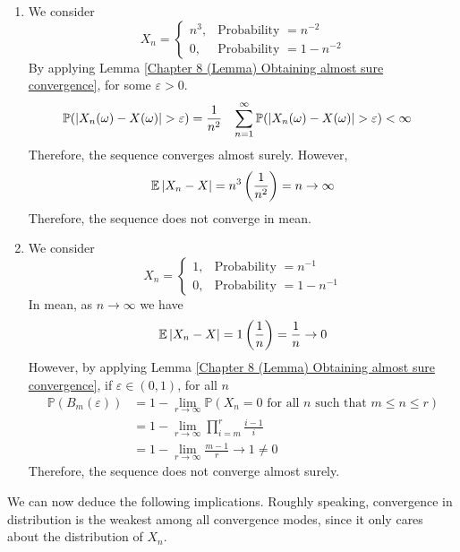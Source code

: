 \documentclass{huhtakm-template-book}
\newcommand{\prob}{\mathbb{P}}
\newcommand{\expect}{\mathbb{E}}
\begin{document}
\begin{proofing}
	\begin{enumerate}
		\item We consider
		\begin{equation*}
			X_{n}=\begin{cases}
				n^{3}, &\text{Probability }=n^{-2}\\
				0, &\text{Probability }=1-n^{-2}
			\end{cases}
		\end{equation*}
		By applying Lemma \ref{Chapter 8 (Lemma) Obtaining almost sure convergence}, for some $\varepsilon>0$.
		\begin{align*}
			\prob(\abs{X_{n}(\omega)-X(\omega)}>\varepsilon)&=\frac{1}{n^{2}} & \sum_{n=1}^{\infty}\prob(\abs{X_{n}(\omega)-X(\omega)}>\varepsilon)&<\infty
		\end{align*}
		Therefore, the sequence converges almost surely. However,
		\begin{equation*}
			\expect\abs{X_{n}-X}=n^{3}\left(\frac{1}{n^{2}}\right)=n\to\infty
		\end{equation*}
		Therefore, the sequence does not converge in mean.
		\item We consider
		\begin{equation*}
			X_{n}=\begin{cases}
				1, &\text{Probability }=n^{-1}\\
				0, &\text{Probability }=1-n^{-1}
			\end{cases}
		\end{equation*}
		In mean, as $n\to\infty$ we have
		\begin{equation*}
			\expect\abs{X_{n}-X}=1\left(\frac{1}{n}\right)=\frac{1}{n}\to 0
		\end{equation*}
		However, by applying Lemma \ref{Chapter 8 (Lemma) Obtaining almost sure convergence}, if $\varepsilon\in(0,1)$, for all $n$
		\begin{align*}
			\prob(B_{m}(\varepsilon))&=1-\lim_{r\to\infty}\prob(X_{n}=0\text{ for all }n\text{ such that }m\leq n\leq r)\\
			&=1-\lim_{r\to\infty}\prod_{i=m}^{r}\frac{i-1}{i}\\
			&=1-\lim_{r\to\infty}\frac{m-1}{r}\to 1\neq 0
		\end{align*}
		Therefore, the sequence does not converge almost surely.
	\end{enumerate}
\end{proofing}
We can now deduce the following implications. Roughly speaking, convergence in distribution is the weakest among all convergence modes, since it only cares about the distribution of $X_{n}$.
\end{document}
